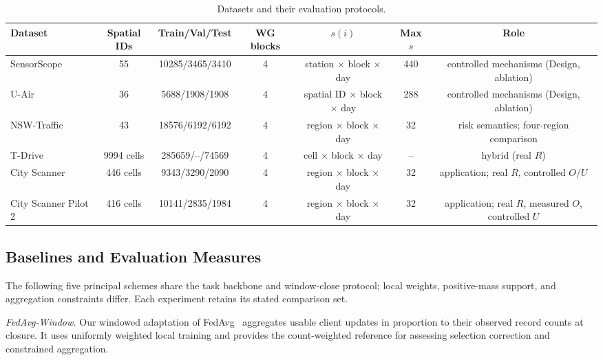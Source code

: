 \documentclass[letterpaper,journal]{IEEEtran}
\begin{document}
\begin{table}[t]
\centering
\caption{Datasets and their evaluation protocols.}
\label{tab:datasets}
\footnotesize
\setlength{\tabcolsep}{3.2pt}
\begin{tabular*}{\textwidth}{@{\extracolsep{\fill}}lcccccc}
\toprule
Dataset & Spatial IDs & Train/Val/Test & WG blocks &
$s(i)$ & Max $s$ & Role\\
\midrule
SensorScope~\cite{ingelrest2010sensorscope} & 55 & 10285/3465/3410 & 4 &
station $\times$ block $\times$ day & 440 & controlled mechanisms (Design, ablation)\\
U-Air~\cite{zheng2013uair} & 36 & 5688/1908/1908 & 4 &
spatial ID $\times$ block $\times$ day & 288 & controlled mechanisms (Design, ablation)\\
NSW-Traffic~\cite{tfnsw2024traffic} & 43 & 18576/6192/6192 & 4 &
region $\times$ block $\times$ day & 32 & risk semantics; four-region comparison\\
T-Drive~\cite{yuan2010tdrive} & 9994 cells & 285659/--/74569 & 4 &
cell $\times$ block $\times$ day & -- & hybrid (real $R$)\\
City Scanner~\cite{wang2023cityscanner} & 446 cells & 9343/3290/2090 & 4 &
region $\times$ block $\times$ day & 32 & application; real $R$, controlled $O/U$\\
City Scanner Pilot 2 & 416 cells & 10141/2835/1984 & 4 &
region $\times$ block $\times$ day & 32 & application; real $R$, measured $O$, controlled $U$\\
\bottomrule
\end{tabular*}
\end{table}

\subsection{Baselines and Evaluation Measures}
\label{subsec:eval_methods}

The following five principal schemes share the task backbone and window-close
protocol; local weights, positive-mass support, and aggregation constraints differ.
Each experiment retains its stated comparison set.

\noindent\textit{FedAvg-Window.}
Our windowed adaptation of FedAvg~\cite{mcmahan2017communication} aggregates
usable client updates in proportion to their observed record counts at closure.
It uses uniformly weighted local training and provides the count-weighted
reference for assessing selection correction and constrained aggregation.
\end{document}
